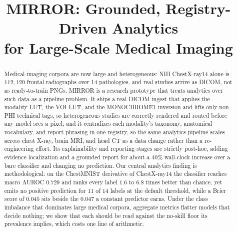 \documentclass[conference]{IEEEtran}
\begin{document}
\title{MIRROR: Grounded, Registry-Driven Analytics\\
for Large-Scale Medical Imaging}

\author{%
\and
{}
}

\maketitle

\begin{abstract}
Medical-imaging corpora are now large and heterogeneous: NIH ChestX-ray14 alone is
$112{,}120$ frontal radiographs over 14 pathologies, and real studies arrive as
DICOM, not as ready-to-train PNGs. MIRROR is a research prototype that treats
analytics over such data as a pipeline problem. It ships a real DICOM ingest that
applies the modality LUT, the VOI LUT, and the MONOCHROME1 inversion and lifts only
non-PHI technical tags, so heterogeneous studies are correctly rendered and routed
before any model sees a pixel; and it centralizes each modality's taxonomy,
anatomical vocabulary, and report phrasing in one registry, so the same analytics
pipeline scales across chest X-ray, brain MRI, and head CT as a data change rather
than a re-engineering effort. Its explainability and reporting stages are strictly
post-hoc, adding evidence localization and a grounded report for about a $40\%$
wall-clock increase over a bare classifier and changing no prediction. Our central
analytics finding is methodological: on the ChestMNIST derivative of ChestX-ray14
the classifier reaches macro AUROC $0.729$ and ranks every label $1.6$ to $6.8$
times better than chance, yet emits no positive prediction for 11 of 14 labels at
the default threshold, while a Brier score of $0.045$ sits beside the $0.047$ a
constant predictor earns. Under the class imbalance that dominates large medical
corpora, aggregate metrics flatter models that decide nothing; we show that each
should be read against the no-skill floor its prevalence implies, which costs one
line of arithmetic.
\end{abstract}
\end{document}
